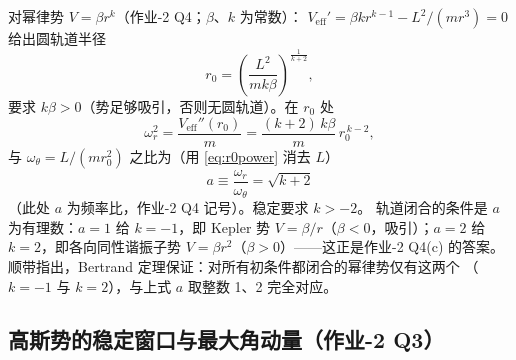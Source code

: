 \documentclass[UTF8,a4paper,11pt]{ctexart}
\begin{document}
对幂律势 $V=\beta r^k$（作业-2 Q4；$\beta$、$k$ 为常数）：
$V_{\mathrm{eff}}'=\beta k r^{k-1}-L^2/(mr^3)=0$ 给出圆轨道半径
\begin{equation}
  r_0=\left(\frac{L^2}{mk\beta}\right)^{\!\!\frac{1}{k+2}},
  \label{eq:r0power}
\end{equation}
要求 $k\beta>0$（势足够吸引，否则无圆轨道）。在 $r_0$ 处
\begin{equation}
  \omega_r^2=\frac{V_{\mathrm{eff}}''(r_0)}{m}
  =\frac{(k+2)\,k\beta}{m}\,r_0^{\,k-2},
  \label{eq:wrpower}
\end{equation}
与 $\omega_\theta=L/(mr_0^2)$ 之比为（用 \eqref{eq:r0power} 消去 $L$）
\begin{equation}
  \boxed{\;a\equiv\frac{\omega_r}{\omega_\theta}=\sqrt{k+2}\;}
  \label{eq:apower}
\end{equation}
（此处 $a$ 为频率比，作业-2 Q4 记号）。稳定要求 $k>-2$。
轨道闭合的条件是 $a$ 为有理数：$a=1$ 给 $k=-1$，即 Kepler 势
$V=\beta/r$（$\beta<0$，吸引）；$a=2$ 给 $k=2$，即各向同性谐振子势
$V=\beta r^2$（$\beta>0$）——这正是作业-2 Q4(c) 的答案。
顺带指出，Bertrand 定理保证：对所有初条件都闭合的幂律势仅有这两个
（$k=-1$ 与 $k=2$），与上式 $a$ 取整数 1、2 完全对应。

\subsection{高斯势的稳定窗口与最大角动量（作业-2 Q3）}
\label{sub:gaussian}
\end{document}
